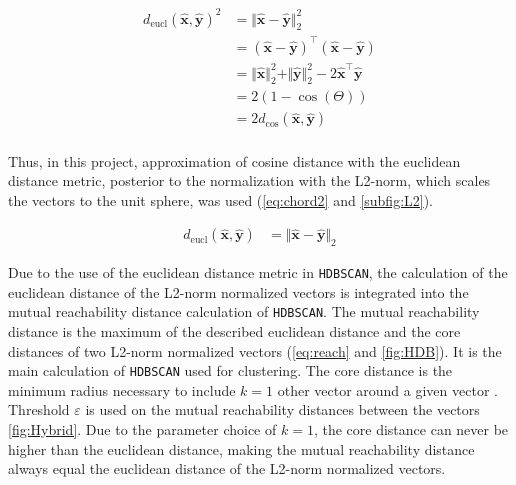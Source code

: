\begin{equation}\label{eq:chord3}
    \begin{aligned}  
        d_{\text{eucl}}(\mathbf{\hat{x}},\mathbf{\hat{y}})^2 &= \Vert\mathbf{\hat{x}} - \mathbf{\hat{y}}\Vert_2^2\\
        &= (\mathbf{\hat{x}} - \mathbf{\hat{y}})^\top (\mathbf{\hat{x}} - \mathbf{\hat{y}})\\
        &= \Vert\mathbf{\hat{x}}\Vert_2^2 + \Vert\mathbf{\hat{y}}\Vert_2^2 - 2 \mathbf{\hat{x}}^\top\mathbf{\hat{y}}\\
        &= 2 (1 - \cos(\Theta))\\
        &= 2 d_{\text{cos}}(\mathbf{\hat{x}},\mathbf{\hat{y}})\\
    \end{aligned}
\end{equation}

\newpage
Thus, in this project, approximation of cosine distance with the euclidean distance metric, posterior to the normalization with the L2-norm, which scales the vectors to the unit sphere, was used (\autoref{eq:chord2} and \autoref{subfig:L2}). 

\begin{equation}\label{eq:chord2}
    \begin{aligned}
        d_{\text{eucl}}(\mathbf{\hat{x}},\mathbf{\hat{y}}) &= \Vert\mathbf{\hat{x}} - \mathbf{\hat{y}}\Vert_2
    \end{aligned}
\end{equation}

Due to the use of the euclidean distance metric in \texttt{HDBSCAN}, the calculation of the euclidean distance of the L2-norm normalized vectors is integrated into the mutual reachability distance calculation of \texttt{HDBSCAN}. The mutual reachability distance is the maximum of the described euclidean distance and the core distances of two L2-norm normalized vectors (\autoref{eq:reach} and \autoref{fig:HDB}). It is the main calculation of \texttt{HDBSCAN} used for clustering. The core distance is the minimum radius necessary to include $k=1$ other vector around a given vector \autocite{mcinnes_hdbscan_2017}. Threshold $\varepsilon$ is used on the mutual reachability distances between the vectors \autoref{fig:Hybrid}. Due to the parameter choice of $k=1$, the core distance can never be higher than the euclidean distance, making the mutual reachability distance always equal the euclidean distance of the L2-norm normalized vectors. 

